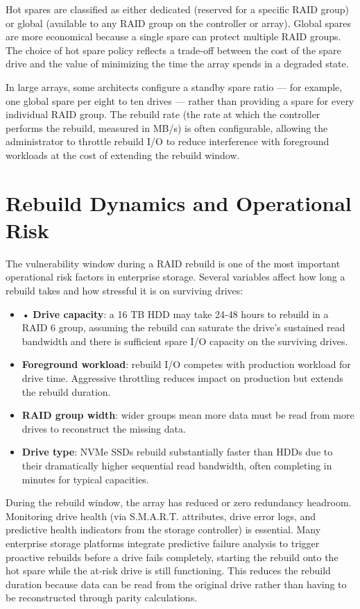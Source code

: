Hot spares are classified as either dedicated (reserved for a specific RAID group) or global (available to any RAID group on the controller or array). Global spares are more economical because a single spare can protect multiple RAID groups. The choice of hot spare policy reflects a trade-off between the cost of the spare drive and the value of minimizing the time the array spends in a degraded state.

In large arrays, some architects configure a standby spare ratio --- for example, one global spare per eight to ten drives --- rather than providing a spare for every individual RAID group. The rebuild rate (the rate at which the controller performs the rebuild, measured in MB/s) is often configurable, allowing the administrator to throttle rebuild I/O to reduce interference with foreground workloads at the cost of extending the rebuild window.

\section{Rebuild Dynamics and Operational Risk}
The vulnerability window during a RAID rebuild is one of the most important operational risk factors in enterprise storage. Several variables affect how long a rebuild takes and how stressful it is on surviving drives:

\begin{itemize}
  \item • \textbf{Drive capacity}: a 16 TB HDD may take 24-48 hours to rebuild in a RAID 6 group, assuming the rebuild can saturate the drive's sustained read bandwidth and there is sufficient spare I/O capacity on the surviving drives.
  \item \textbf{Foreground workload}: rebuild I/O competes with production workload for drive time. Aggressive throttling reduces impact on production but extends the rebuild duration.
  \item \textbf{RAID group width}: wider groups mean more data must be read from more drives to reconstruct the missing data.
  \item \textbf{Drive type}: NVMe SSDs rebuild substantially faster than HDDs due to their dramatically higher sequential read bandwidth, often completing in minutes for typical capacities.
\end{itemize}

During the rebuild window, the array has reduced or zero redundancy headroom. Monitoring drive health (via S.M.A.R.T. attributes, drive error logs, and predictive health indicators from the storage controller) is essential. Many enterprise storage platforms integrate predictive failure analysis to trigger proactive rebuilds before a drive fails completely, starting the rebuild onto the hot spare while the at-risk drive is still functioning. This reduces the rebuild duration because data can be read from the original drive rather than having to be reconstructed through parity calculations.

